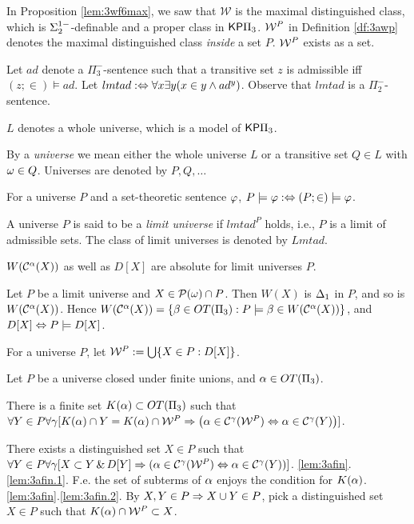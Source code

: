 \documentclass{article}
\begin{document}
In Proposition \ref{lem:3wf6max}, we saw that $\mathcal{W}$ is the maximal distinguished class,
which is $\Sigma^{1-}_{2}$-definable and a proper class in ${\sf KP}\Pi_{3}$.
${\cal W}^{P}$ in Definition \ref{df:3awp} denotes the maximal distinguished class \textit{inside} a set
$P$. ${\cal W}^{P}$ exists as a set.

Let $ad$ denote a $\Pi^{-}_{3}$-sentence such that a transitive set $z$ is admissible 
iff $(z;\in)\models ad$.
Let $lmtad :\Leftrightarrow \forall x\exists y(x\in y \land ad^{y})$.
Observe that $lmtad$ is a $\Pi^{-}_{2}$-sentence.


\bdf\label{df:3auni}
{\rm
$L$ denotes a whole universe, which is a model of ${\sf KP}\Pi_{3}$.
\benu
\item 
By a \textit{universe} 
we mean either the whole universe $L$ or a transitive set $Q\in L$ with $\omega\in Q$. 
Universes are denoted by $P,Q,\ldots$

\item For a universe $P$ and a set-theoretic sentence $\varphi$, 
$P\models\varphi :\Leftrightarrow (P;\in)\models\varphi$.

\item 
A universe $P$ is said to be a \textit{limit universe} if $lmtad^{P}$ holds, i.e., $P$
 is a limit of admissible sets. The class of limit universes is denoted by $Lmtad$.
 
\eenu
}
\edf

\blem\label{lem:3ahier} 
$W(\mathcal{C}^{\alpha}(X))$ as well as $D[X]$ are absolute for limit universes $P$.

\elem
\bprf
Let $P$ be a limit universe and $X\in \mathcal{P}(\omega)\cap P$. 
Then $W(X)$ is $\Delta_{1}$ in $P$, and so is $W(\mathcal{C}^{\alpha}(X))$.
Hence $W(\mathcal{C}^{\alpha}(X))=\{\beta\in OT(\Pi_{3}):P\models \beta\in W(\mathcal{C}^{\alpha}(X))\}$,
and $D[X]\Leftrightarrow P\models D[X]$.
\eprf


\bdf\label{df:3awp}
{\rm 
For a universe $P$, let
$
{\cal W}^{P}:=\bigcup\{X\in P:D[X]\}
$.
}
\edf





\blem\label{lem:3afin}
Let $P$ be a universe closed under finite unions, and $\alpha\in OT(\Pi_{3})$.
\benu
\item\label{lem:3afin.1}
There is a finite set $K(\alpha)\subset OT(\Pi_{3})$ such that
$
\forall Y\in P\forall\gamma
[
K(\alpha)\cap Y=K(\alpha)\cap {\cal W}^{P} 
\Rightarrow 
\left(
\alpha\in \mathcal{C}^{\gamma}({\cal W}^{P})
\Leftrightarrow \alpha\in \mathcal{C}^{\gamma}(Y)
\right)
]
$.

\item\label{lem:3afin.2}
There exists a distinguished set $X\in P$ such that
$
\forall Y\in P\forall\gamma
[
X\subset Y\,\&\, D[Y]
\Rightarrow (\alpha\in \mathcal{C}^{\gamma}({\cal W}^{P})
\Leftrightarrow \alpha\in \mathcal{C}^{\gamma}(Y)
)
]
$.
\eenu
\elem
\bprf
\ref{lem:3afin}.\ref{lem:3afin.1}.
F.e. the set of subterms of $\alpha$ enjoys the condition for $K(\alpha)$.
\\
\ref{lem:3afin}.\ref{lem:3afin.2}.
By $X,Y\in P\Rightarrow X\cup Y\in P$, pick a distinguished set $X\in P$ such that
$K(\alpha)\cap{\cal W}^{P}\subset X$.
\eprf
\end{document}
